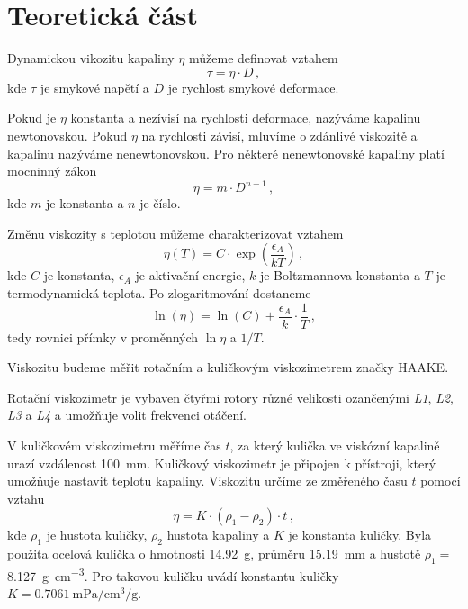 \section*{Teoretická část}
Dynamickou vikozitu kapaliny $\eta$ můžeme definovat vztahem \cite{skripta}
\begin{equation}
\tau = \eta \cdot D \,,
\end{equation}
kde $\tau$ je smykové napětí a $D$ je rychlost smykové deformace.

Pokud je $\eta$ konstanta a nezívisí na rychlosti deformace, nazýváme kapalinu newtonovskou.
Pokud $\eta$ na rychlosti závisí, mluvíme o zdánlivé viskozitě a kapalinu nazýváme nenewtonovskou.
Pro některé nenewtonovské kapaliny platí mocninný zákon \cite{skripta}
\begin{equation} \label{eq::fitnenewton}
\eta = m \cdot D^{n-1} \,,
\end{equation}
kde $m$ je konstanta a $n$ je číslo.

Změnu viskozity s teplotou můžeme charakterizovat vztahem \cite{skripta}
\begin{equation}
\eta(T) = C \cdot \exp(\frac{\epsilon_A}{kT}) \,,
\end{equation}
kde $C$ je konstanta, $\epsilon_A$ je aktivační energie, $k$ je Boltzmannova konstanta a $T$ je termodynamická teplota.
Po zlogaritmování dostaneme
\begin{equation} \label{eq::primka}
\ln(\eta) = \ln(C) + \frac{\epsilon_A}{k} \cdot \frac{1}{T} \,,
\end{equation}
tedy rovnici přímky v proměnných $\ln{\eta}$ a $1/T$.

Viskozitu budeme měřit rotačním a kuličkovým viskozimetrem značky HAAKE.

Rotační viskozimetr je vybaven čtyřmi rotory různé velikosti ozančenými \emph{L1}, \emph{L2}, \emph{L3} a \emph{L4} a umožňuje volit frekvenci otáčení.

V kuličkovém viskozimetru měříme čas $t$, za který kulička ve viskózní kapalině urazí vzdálenost \SI{100}{\mm}.
Kuličkový viskozimetr je připojen k přístroji, který umožňuje nastavit teplotu kapaliny.
Viskozitu určíme ze změřeného času $t$ pomocí vztahu \cite{skripta}
\begin{equation} \label{eq::teplotavypocet}
\eta = K \cdot (\rho_1 - \rho_2) \cdot t \,,
\end{equation}
kde $\rho_1$ je hustota kuličky, $\rho_2$ hustota kapaliny a $K$ je konstanta kuličky.
Byla použita ocelová kulička o hmotnosti \SI{14.92}{\g}, průměru \SI{15.19}{mm} a hustotě $\rho_1 = $\SI{8.127}{\g\per\cm\cubed}.
Pro takovou kuličku uvádí \cite{skripta} konstantu kuličky \mbox{$K = \SI{0.7061}{\milli\Pa\per\cm\cubed\per\g}$}.

